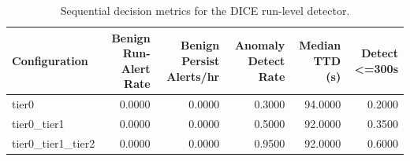 \begin{table}[t]
\centering
\caption{Sequential decision metrics for the DICE run-level detector.}
\label{tab:dice_sequential_metrics}
\footnotesize
\begin{tabular}{lrrrrr}
\toprule
Configuration & Benign Run-Alert Rate & Benign Persist Alerts/hr & Anomaly Detect Rate & Median TTD (s) & Detect <=300s \\
\midrule
tier0 & 0.0000 & 0.0000 & 0.3000 & 94.0000 & 0.2000 \\
tier0_tier1 & 0.0000 & 0.0000 & 0.5000 & 92.0000 & 0.3500 \\
tier0_tier1_tier2 & 0.0000 & 0.0000 & 0.9500 & 92.0000 & 0.6000 \\
\bottomrule
\end{tabular}

\end{table}
